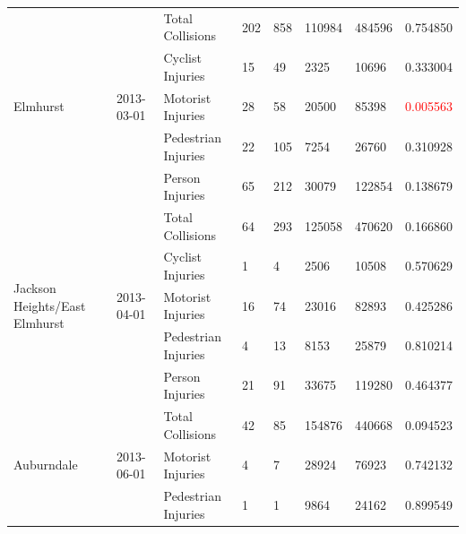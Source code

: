 \documentclass[10pt,journal,compsoc]{IEEEtran}
\begin{document}
\begin{table}[]
\begin{tabular}{|l|l|l|l|l|l|l|l|}
\multirow{5}{*}{Elmhurst}                      & \multirow{5}{*}{2013-03-01} & Total Collisions    & 202       & 858      & 110984     & 484596    & 0.754850 \\ \cline{3-8} 
                                               &                             & Cyclist Injuries    & 15        & 49       & 2325       & 10696     & 0.333004 \\ \cline{3-8} 
                                               &                             & Motorist Injuries   & 28        & 58       & 20500      & 85398     & \textcolor{red}{0.005563} \\ \cline{3-8} 
                                               &                             & Pedestrian Injuries & 22        & 105      & 7254       & 26760     & 0.310928 \\ \cline{3-8} 
                                               &                             & Person Injuries     & 65        & 212      & 30079      & 122854    & 0.138679 \\ \hline
\multirow{5}{*}{Jackson Heights/East Elmhurst} & \multirow{5}{*}{2013-04-01} & Total Collisions    & 64        & 293      & 125058     & 470620    & 0.166860 \\ \cline{3-8} 
                                               &                             & Cyclist Injuries    & 1         & 4        & 2506       & 10508     & 0.570629 \\ \cline{3-8} 
                                               &                             & Motorist Injuries   & 16        & 74       & 23016      & 82893     & 0.425286 \\ \cline{3-8} 
                                               &                             & Pedestrian Injuries & 4         & 13       & 8153       & 25879     & 0.810214 \\ \cline{3-8} 
                                               &                             & Person Injuries     & 21        & 91       & 33675      & 119280    & 0.464377 \\ \hline
\multirow{4}{*}{Auburndale}                    & \multirow{4}{*}{2013-06-01} & Total Collisions    & 42        & 85       & 154876     & 440668    & 0.094523 \\ \cline{3-8} 
                                               &                             & Motorist Injuries   & 4         & 7        & 28924      & 76923     & 0.742132 \\ \cline{3-8} 
                                               &                             & Pedestrian Injuries & 1         & 1        & 9864       & 24162     & 0.899549 \\ \cline{3-8} 

\end{tabular}
\end{table}
\end{document}
